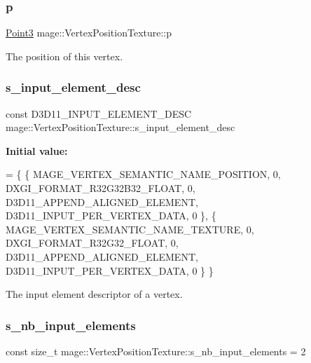 \subsubsection{\texorpdfstring{p}{p}}
{\footnotesize\ttfamily \hyperlink{structmage_1_1_point3}{Point3} mage\+::\+Vertex\+Position\+Texture\+::p}

The position of this vertex. \hypertarget{structmage_1_1_vertex_position_texture_a80b0fac785de688b33c155ea212c2cf3}{}\label{structmage_1_1_vertex_position_texture_a80b0fac785de688b33c155ea212c2cf3} 
\subsubsection{\texorpdfstring{s\+\_\+input\+\_\+element\+\_\+desc}{s\_input\_element\_desc}}
{\footnotesize\ttfamily const D3\+D11\+\_\+\+I\+N\+P\+U\+T\+\_\+\+E\+L\+E\+M\+E\+N\+T\+\_\+\+D\+E\+SC mage\+::\+Vertex\+Position\+Texture\+::s\+\_\+input\+\_\+element\+\_\+desc\hspace{0.3cm}{\ttfamily [static]}}

{\bfseries Initial value\+:}
\begin{DoxyCode}
= \{
        \{ MAGE\_VERTEX\_SEMANTIC\_NAME\_POSITION, 0, DXGI\_FORMAT\_R32G32B32\_FLOAT,    0, 
      D3D11\_APPEND\_ALIGNED\_ELEMENT, D3D11\_INPUT\_PER\_VERTEX\_DATA, 0 \},
        \{ MAGE\_VERTEX\_SEMANTIC\_NAME\_TEXTURE,  0, DXGI\_FORMAT\_R32G32\_FLOAT,       0, 
      D3D11\_APPEND\_ALIGNED\_ELEMENT, D3D11\_INPUT\_PER\_VERTEX\_DATA, 0 \}
    \}
\end{DoxyCode}
The input element descriptor of a vertex. \hypertarget{structmage_1_1_vertex_position_texture_a59bcde456e768910c7f39c7b740b4961}{}\label{structmage_1_1_vertex_position_texture_a59bcde456e768910c7f39c7b740b4961} 
\subsubsection{\texorpdfstring{s\+\_\+nb\+\_\+input\+\_\+elements}{s\_nb\_input\_elements}}
{\footnotesize\ttfamily const size\+\_\+t mage\+::\+Vertex\+Position\+Texture\+::s\+\_\+nb\+\_\+input\+\_\+elements = 2\hspace{0.3cm}{\ttfamily [static]}}

